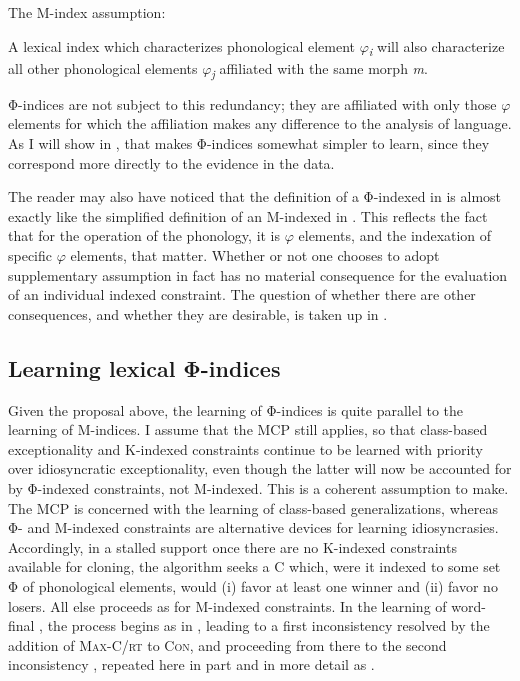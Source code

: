 \documentclass[output=paper,
modfonts
]{LSP/langsci}
\begin{document}
\ea \label{ex:round:47} The M-index assumption:

A lexical index which characterizes phonological element $\varphi $\textit{\textsubscript{i}} will also characterize all other phonological elements $\varphi $\textit{\textsubscript{j}} affiliated with the same morph \textit{m}.
\z

\noindent Φ-indices are not subject to this redundancy; they are affiliated with only those $\varphi $ elements for which the affiliation makes any difference to the analysis of language. As I will show in , that makes Φ-indices somewhat simpler to learn, since they correspond more directly to the evidence in the data. 

The reader may also have noticed that the definition of a Φ-indexed  in  is almost exactly like the simplified definition of an M-indexed  in . This reflects the fact that for the operation of the phonology, it is $\varphi $ elements, and the indexation of specific $\varphi $ elements, that matter. Whether or not one chooses to adopt supplementary assumption  in fact has no material consequence for the evaluation of an individual indexed constraint. The question of whether there are other consequences, and whether they are desirable, is taken up in .

\subsection[Learning lexical Φ{}-indices]{Learning lexical Φ-indices}\label{sec:round:7.3}
\label{bkm:Ref335244838}
Given the proposal above, the learning of Φ-indices is quite parallel to the learning of M-indices. I assume that the MCP still applies, so that class-based exceptionality and K-indexed constraints continue to be learned with priority over idiosyncratic exceptionality, even though the latter will now be accounted for by Φ-indexed constraints, not M-indexed. This is a coherent assumption to make. The MCP is concerned with the learning of class-based generalizations, whereas Φ- and M-indexed constraints are alternative devices for learning idiosyncrasies. Accordingly, in a stalled support once there are no K-indexed constraints available for cloning, the algorithm seeks a  C which, were it indexed to some set Φ\textit{} of phonological elements, would (i) favor at least one winner and (ii) favor no losers. All else proceeds as for M-indexed constraints. In the learning of  word-final , the process begins as in , leading to a first inconsistency resolved by the addition of \textsc{Max-C/rt} to \textsc{Con}, and proceeding from there to the second inconsistency , repeated here in part and in more detail as .
\end{document}
